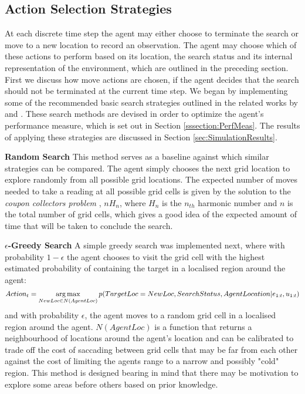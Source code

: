 \subsection{Action Selection Strategies}\label{subsubsec:ActionSelection}
At each discrete time step the agent may either choose to terminate the search or move to a new location to record an observation. The agent may choose which of these actions to perform based on its location, the search status and its internal representation of the environment, which are outlined in the preceding section. First we discuss how move actions are chosen, if the agent decides that the search should not be terminated at the current time step. We began by implementing some of the recommended basic search strategies outlined in the related works by \citeauthor{Chung2007ASearch} \cite{Chung2007ASearch} and \citeauthor{Waharte2010SupportingUAVs} \cite{Waharte2010SupportingUAVs}. These search methods are devised in order to optimize the agent's performance measure, which is set out in Section \ref{sssection:PerfMeas}. The results of applying these strategies are discussed in Section \ref{sec:SimulationResults}.\par 
\textbf{Random Search}
This method serves as a baseline against which similar strategies can be compared. The agent simply chooses the next grid location to explore randomly from all possible grid locations. The expected number of moves needed to take a reading at all possible grid cells is given by the solution to the \textit{coupon collectors problem} \cite{Erdos1961OnTheory}, $nH_n$, where $H_n$ is the $n_{th}$ harmonic number and $n$ is the total number of grid cells, which gives a good idea of the expected amount of time that will be taken to conclude the search.

\textbf{$\epsilon$-Greedy Search}
A simple greedy search was implemented next, where with probability $1-\epsilon$ the agent chooses to visit the grid cell with the highest estimated probability of containing the target in a localised region around the agent:
\footnotesize
\[
Action_t = \operatorname*{arg\,max}_{NewLoc \in N(AgentLoc)}{p(TargetLoc = NewLoc, SearchStatus, AgentLocation| e_{1:t}, u_{1:t})}
\]
\normalsize
and with probability $\epsilon$, the agent moves to a random grid cell in a localised region around the agent.
$N(AgentLoc)$ is a function that returns a neighbourhood of locations around the agent's location and can be calibrated to trade off the cost of saccading between grid cells that may be far from each other against the cost of limiting the agents range to a narrow and possibly "cold" region. This method is designed bearing in mind that there may be motivation to explore some areas before others based on prior knowledge. 

